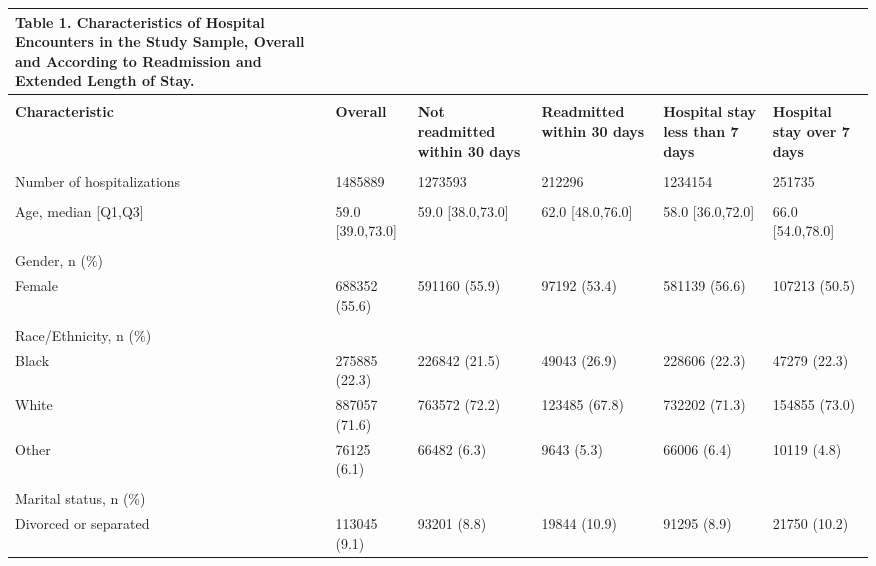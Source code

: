 %
\begin{adjustbox}{width={\textwidth},totalheight={\textheight},keepaspectratio,frame,padding=0ex 0ex -910ex 0ex}%
\sffamily %
{%
\begin{tabular}{L{20em}C{10em}C{10em}C{10em}C{10em}C{10em}}%
{{\textbf{\color{NEJMRed} Table 1. }}%
\textbf{Characteristics  of Hospital Encounters in the Study Sample, Overall and According to Readmission and Extended Length of Stay.}}\\[10pt]%
\hline%
 & & & & & \\%
\textbf{Characteristic} & \textbf{Overall} & \textbf{Not readmitted within 30 days} & \textbf{Readmitted within 30 days} & \textbf{Hospital stay less than 7 days} & \textbf{Hospital stay over 7 days}\\
 &  &  &  &    & \\
 Number of hospitalizations  & 1485889 & 1273593 & 212296 & 1234154 & 251735\\
  &  &  &  &  & \\
Age, median [Q1,Q3] &  59.0 [39.0,73.0] & 59.0 [38.0,73.0] & 62.0 [48.0,76.0] & 58.0 [36.0,72.0] & 66.0 [54.0,78.0]\\
 &  &  &  &  & \\
Gender, n (\%) & &    &     &        &         \\
\hspace{3mm} Female & 688352 (55.6) & 591160 (55.9) & 97192 (53.4) & 581139 (56.6) & 107213 (50.5)\\
 &  &  &  &  &  \\
Race/Ethnicity, n (\%) & &    &     &        &         \\
\hspace{3mm} Black & 275885 (22.3) & 226842 (21.5) & 49043 (26.9) & 228606 (22.3) & 47279 (22.3)\\
  \hspace{3mm} White & 887057 (71.6) & 763572 (72.2) & 123485 (67.8) & 732202 (71.3) & 154855 (73.0)\\
  \hspace{3mm} Other & 76125 (6.1) & 66482 (6.3) & 9643 (5.3) & 66006 (6.4) & 10119 (4.8)\\
  &  &  &  &  &  \\
Marital status, n (\%)  & &    &     &        &         \\
\hspace{3mm} Divorced or separated & 113045 (9.1) & 93201 (8.8) & 19844 (10.9) & 91295 (8.9) & 21750 (10.2)\\

\end{tabular}}
\end{adjustbox}

